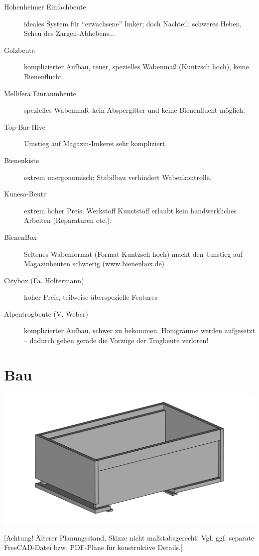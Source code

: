 \documentclass[12pt,a4paper,ngerman]{scrartcl}
\begin{document}
\begin{description}
\item[Hohenheimer Einfachbeute] ideales System für \enquote{erwachsene} Imker; doch Nachteil: schweres Heben, Scheu des Zargen-Abhebens...
\item[Golzbeute] komplizierter Aufbau, teuer, spezielles Wabenmaß (Kuntzsch hoch), keine Bienenflucht.
\item[Mellifera Einraumbeute] spezielles Wabenmaß, kein Abspergitter und keine Bienenflucht möglich.
\item[Top-Bar-Hive] Umstieg auf Magazin-Imkerei sehr kompliziert.
\item[Bienenkiste] extrem unergonomisch; Stabilbau verhindert Wabenkontrolle.
\item[Kunesa-Beute] extrem hoher Preis; Werkstoff Kunststoff erlaubt kein handwerkliches Arbeiten (Reparaturen etc.).
\item[BienenBox] Seltenes Wabenformat (Format Kuntzsch hoch) macht den Umstieg auf Magazinbeuten schwierig
  (www.bienenbox.de)
\item[Citybox (Fa. Holtermann)] hoher Preis, teilweise überspezielle Features
\item[Alpentrogbeute (V. Weber)] komplizierter Aufbau, schwer zu bekommen, Honigräume werden aufgesetzt --
  dadurch gehen gerade die Vorzüge der Trogbeute verloren!
\end{description}


\section{Bau}


\includegraphics[width=\textwidth]{ansicht1}

\begin{center}
  [Achtung! Älterer Planungsstand, Skizze nicht maßstabsgerecht!
  Vgl. ggf. separate FreeCAD-Datei bzw. PDF-Pläne für konstruktive Details.]
\end{center}
\end{document}
